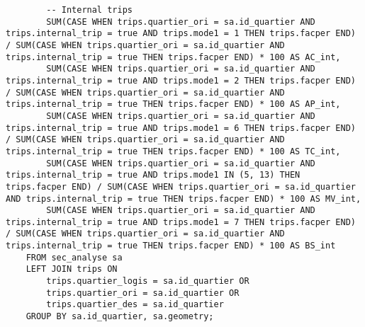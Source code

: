 \begin{lstlisting}
        -- Internal trips
        SUM(CASE WHEN trips.quartier_ori = sa.id_quartier AND trips.internal_trip = true AND trips.mode1 = 1 THEN trips.facper END) / SUM(CASE WHEN trips.quartier_ori = sa.id_quartier AND trips.internal_trip = true THEN trips.facper END) * 100 AS AC_int,
        SUM(CASE WHEN trips.quartier_ori = sa.id_quartier AND trips.internal_trip = true AND trips.mode1 = 2 THEN trips.facper END) / SUM(CASE WHEN trips.quartier_ori = sa.id_quartier AND trips.internal_trip = true THEN trips.facper END) * 100 AS AP_int,
        SUM(CASE WHEN trips.quartier_ori = sa.id_quartier AND trips.internal_trip = true AND trips.mode1 = 6 THEN trips.facper END) / SUM(CASE WHEN trips.quartier_ori = sa.id_quartier AND trips.internal_trip = true THEN trips.facper END) * 100 AS TC_int,
        SUM(CASE WHEN trips.quartier_ori = sa.id_quartier AND trips.internal_trip = true AND trips.mode1 IN (5, 13) THEN trips.facper END) / SUM(CASE WHEN trips.quartier_ori = sa.id_quartier AND trips.internal_trip = true THEN trips.facper END) * 100 AS MV_int,
        SUM(CASE WHEN trips.quartier_ori = sa.id_quartier AND trips.internal_trip = true AND trips.mode1 = 7 THEN trips.facper END) / SUM(CASE WHEN trips.quartier_ori = sa.id_quartier AND trips.internal_trip = true THEN trips.facper END) * 100 AS BS_int
    FROM sec_analyse sa
    LEFT JOIN trips ON 
        trips.quartier_logis = sa.id_quartier OR 
        trips.quartier_ori = sa.id_quartier OR 
        trips.quartier_des = sa.id_quartier
    GROUP BY sa.id_quartier, sa.geometry;
\end{lstlisting}
